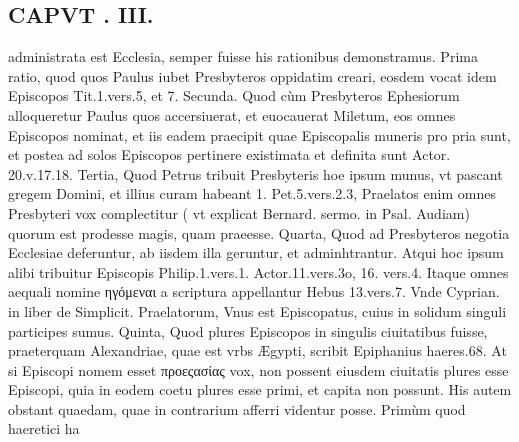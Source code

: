 \documentclass{article}
\begin{document}
\begin{pages}
\section*{CAPVT . III. }
\marginpar{[ p.95 ]}\pstart administrata est Ecclesia, semper fuisse his rationibus demonstramus.  \pend\pstart Prima ratio, quod quos Paulus iubet Presbyteros oppidatim creari, eosdem vocat idem Episcopos Tit.1.vers.5, et 7.  \pend\pstart Secunda. Quod cùm Presbyteros Ephesiorum alloqueretur Paulus quos accersiuerat, et euocauerat Miletum, eos omnes Episcopos nominat, et iis eadem praecipit quae Episcopalis muneris pro pria sunt, et postea ad solos Episcopos pertinere existimata et definita sunt Actor. 20.v.17.18.  \pend\pstart Tertia, Quod Petrus tribuit Presbyteris hoe ipsum munus, vt pascant gregem Domini, et illius curam habeant 1. Pet.5.vers.2.3, Praelatos enim omnes Presbyteri vox complectitur ( vt explicat Bernard. sermo. in Psal. Audiam) quorum est prodesse magis, quam praeesse.  \pend\pstart Quarta, Quod ad Presbyteros negotia Ecclesiae deferuntur, ab iisdem illa geruntur, et adminhtrantur. Atqui hoc ipsum alibi tribuitur Episcopis Philip.1.vers.1. Actor.11.vers.3o, 16. vers.4. Itaque omnes aequali nomine ηγόμεναι a scriptura appellantur Hebus 13.vers.7. Vnde Cyprian. in liber  de Simplicit. Praelatorum, Vnus est Episcopatus, cuius in solidum singuli participes sumus.  \pend\pstart Quinta, Quod plures Episcopos in singulis ciuitatibus fuisse, praeterquam Alexandriae, quae est vrbs Ægypti, scribit Epiphanius haeres.68. At si Episcopi nomem esset προεςασίας vox, non possent eiusdem ciuitatis plures esse Episcopi, quia in eodem coetu plures esse primi, et capita non possunt.  \pend\pstart His autem obstant quaedam, quae in contrarium afferri videntur posse. Primùm quod haeretici ha\pend

\end{pages}
\end{document}
